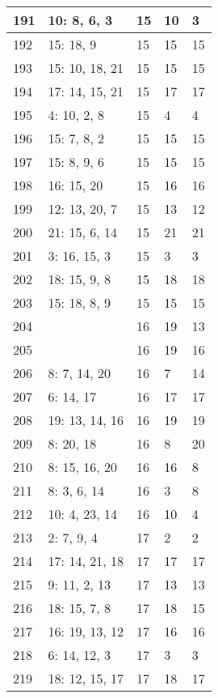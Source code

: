 \documentclass{article} %
\begin{document}
\begin{longtable}{| l | l | l | l | l |}
        191 & 10: 8, 6, 3 & 15 & 10 & 3 \\ \hline
        192 & 15: 18, 9 & 15 & 15 & 15 \\ \hline
        193 & 15: 10, 18, 21 & 15 & 15 & 15 \\ \hline
        194 & 17: 14, 15, 21 & 15 & 17 & 17 \\ \hline
        195 & 4: 10, 2, 8 & 15 & 4 & 4 \\ \hline
        196 & 15: 7, 8, 2 & 15 & 15 & 15 \\ \hline
        197 & 15: 8, 9, 6 & 15 & 15 & 15 \\ \hline
        198 & 16: 15, 20 & 15 & 16 & 16 \\ \hline
        199 & 12: 13, 20, 7 & 15 & 13 & 12 \\ \hline
        200 & 21: 15, 6, 14 & 15 & 21 & 21 \\ \hline
        201 & 3: 16, 15, 3 & 15 & 3 & 3 \\ \hline
        202 & 18: 15, 9, 8 & 15 & 18 & 18 \\ \hline
        203 & 15: 18, 8, 9 & 15 & 15 & 15 \\ \hline
        204 &  & 16 & 19 & 13 \\ \hline
        205 &  & 16 & 19 & 16 \\ \hline
        206 & 8: 7, 14, 20 & 16 & 7 & 14 \\ \hline
        207 & 6: 14, 17 & 16 & 17 & 17 \\ \hline
        208 & 19: 13, 14, 16 & 16 & 19 & 19 \\ \hline
        209 & 8: 20, 18 & 16 & 8 & 20 \\ \hline
        210 & 8: 15, 16, 20 & 16 & 16 & 8 \\ \hline
        211 & 8: 3, 6, 14 & 16 & 3 & 8 \\ \hline
        212 & 10: 4, 23, 14 & 16 & 10 & 4 \\ \hline
        213 & 2: 7, 9, 4 & 17 & 2 & 2 \\ \hline
        214 & 17: 14, 21, 18 & 17 & 17 & 17 \\ \hline
        215 & 9: 11, 2, 13 & 17 & 13 & 13 \\ \hline
        216 & 18: 15, 7, 8 & 17 & 18 & 15 \\ \hline
        217 & 16: 19, 13, 12 & 17 & 16 & 16 \\ \hline
        218 & 6: 14, 12, 3 & 17 & 3 & 3 \\ \hline
        219 & 18: 12, 15, 17 & 17 & 18 & 17 \\ \hline

\end{longtable}
\end{document}
